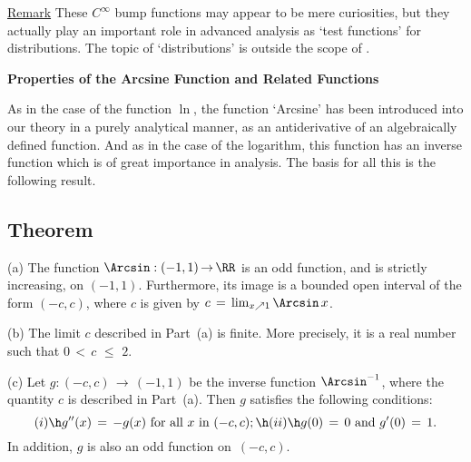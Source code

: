 \V

        \underline{Remark}  These $C^{{\infty}}$ bump functions may appear to be mere curiosities,
    but they actually play an important role in advanced analysis as `test functions' for distributions.
    The topic of `distributions' is outside the scope of {\ThisText}.




\VV

        {\bf Properties of the Arcsine Function and Related Functions}

\VV

        As in the case of the function $\ln$, the function `Arcsine' has been introduced into our theory in a purely analytical manner,
    as an antiderivative of an algebraically defined function.
    And as in the case of the logarithm, this function has an inverse function which is of great importance in analysis.
    The basis for all this is the following result.

\V

             \subsection{\small{\bf Theorem}}
            \label{ThmE45.128A}

\V

        \hspace*{\parindent}(a) The function ${\Arcsin}:(-1,1) \,{\rightarrow}\, {\RR}$ is an odd function, and is strictly increasing, on $(-1,1)$.
    Furthermore, its image is a bounded open interval of the form $(-c,c)$, where $c$ is given by $c \,=\, \lim_{x{\nearrow}1} {\Arcsin}\,x$.

\V

        (b) The limit $c$ described in Part~(a) is finite.
    More precisely, it is a real number such that $0\,<\,c\,\,{\leq}\,\,2$.

\V

        (c) Let $g:(-c,c) \,{\rightarrow}\, (-1,1)$ be the inverse function ${\Arcsin}^{-1}$, where the quantity $c$ is described in Part~(a).
    Then $g$ satisfies the following conditions:
        \begin{equation}
        \label{EqnE.128a}
        (i) \h g''(x) \,=\, -g(x) \mbox{ for all $x$ in $(-c,c)$}; \h (ii) \h g(0) \,=\, 0 \mbox{ and } g'(0) \,=\, 1.
        \end{equation}
    In addition, $g$ is also an odd function on~$(-c,c)$.

